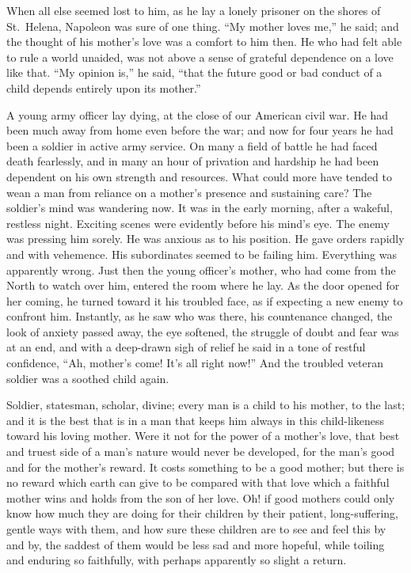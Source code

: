 \documentclass[
]{book}
\begin{document}
When all else seemed lost to him, as he lay a lonely prisoner on the shores of St.~Helena, Napoleon was sure of one thing. ``My mother loves me,'' he said; and the thought of his mother's love was a comfort to him then. He who had felt able to rule a world unaided, was not above a sense of grateful dependence on a love like that. ``My opinion is,'' he said, ``that the future good or bad conduct of a child depends entirely upon its mother.''

A young army officer lay dying, at the close of our American civil war. He had been much away from home even before the war; and now for four years he had been a soldier in active army service. On many a field of battle he had faced death fearlessly, and in many an hour of privation and hardship he had been dependent on his own strength and resources. What could more have tended to wean a man from reliance on a mother's presence and sustaining care? The soldier's mind was wandering now. It was in the early morning, after a wakeful, restless night. Exciting scenes were evidently before his mind's eye. The enemy was pressing him sorely. He was anxious as to his position. He gave orders rapidly and with vehemence. His subordinates seemed to be failing him. Everything was apparently wrong. Just then the young officer's mother, who had come from the North to watch over him, entered the room where he lay. As the door opened for her coming, he turned toward it his troubled face, as if expecting a new enemy to confront him. Instantly, as he saw who was there, his countenance changed, the look of anxiety passed away, the eye softened, the struggle of doubt and fear was at an end, and with a deep-drawn sigh of relief he said in a tone of restful confidence, ``Ah, mother's come! It's all right now!'' And the troubled veteran soldier was a soothed child again.

Soldier, statesman, scholar, divine; every man is a child to his mother, to the last; and it is the best that is in a man that keeps him always in this child-likeness toward his loving mother. Were it not for the power of a mother's love, that best and truest side of a man's nature would never be developed, for the man's good and for the mother's reward. It costs something to be a good mother; but there is no reward which earth can give to be compared with that love which a faithful mother wins and holds from the son of her love. Oh! if good mothers could only know how much they are doing for their children by their patient, long-suffering, gentle ways with them, and how sure these children are to see and feel this by and by, the saddest of them would be less sad and more hopeful, while toiling and enduring so faithfully, with perhaps apparently so slight a return.
\end{document}
